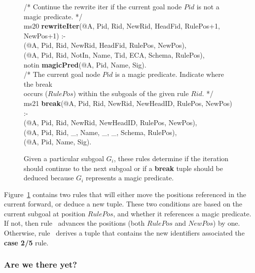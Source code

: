 \begin{figure}[!t]
\ssp
\centering
\begin{boxedminipage}{\linewidth}
/* Continue the rewrite iter if the current goal node $Pid$ is not a magic predicate. */ \\
ms20 {\bf rewriteIter}(@A, Pid, Rid, NewRid, HeadFid, RulePos+1, NewPos+1) :- \\
(@A, Pid, Rid, NewRid, HeadFid, RulePos, NewPos), \\
(@A, Pid, Rid, NotIn, Name, Tid, ECA, Schema, RulePos), \\
\datalogspace notin {\bf magicPred}(@A, Pid, Name, Sig). \\

/* The current goal node $Pid$ is a magic predicate. Indicate where the break \\
occurs ($RulePos$) within the subgoals of the given rule $Rid$. */ \\
ms21 {\bf break}(@A, Pid, Rid, NewRid, NewHeadID, RulePos, NewPos) :- \\
(@A, Pid, Rid, NewRid, NewHeadID, RulePos, NewPos), \\
(@A, Pid, Rid, \_, Name, \_, \_, Schema, RulePos), \\
(@A, Pid, Name, Sig).

\end{boxedminipage}
\caption{\label{ch:magic:fig:rewrite4} Given a particular subgoal $G_i$, these rules determine
if the iteration should continue to the next subgoal or if a {\bf break} tuple should be
deduced because $G_i$ represents a magic predicate. }
\end{figure}

Figure~\ref{ch:magic:fig:rewrite4} contains two rules that will either move the
positions referenced in the current  forward, or deduce a new
 tuple.  These two conditions are based on the current subgoal at
position $RulePos$, and whether it references a magic predicate.  If not, then
rule~ advances the  positions (both $RulePos$ and
$NewPos$) by one.  Otherwise, rule~ derives a  tuple that
contains the new identifiers associated the {\bf case 2/5} rule.

\subsubsection{Are we there yet?}

